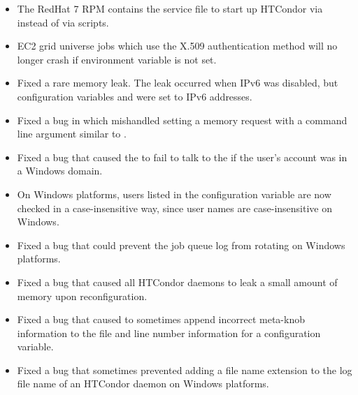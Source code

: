 \begin{itemize}

\item The RedHat 7 RPM contains the service file to start up 
HTCondor via  instead of via  scripts.


\item EC2 grid universe jobs which use the X.509 authentication method will
no longer crash if environment variable  is not set.

\item Fixed a rare memory leak. 
The leak occurred when IPv6 was disabled, 
but configuration variables  
and  were set to IPv6 addresses.

\item Fixed a bug in which  mishandled setting a memory request 
with a command line argument similar to .

\item Fixed a bug that caused the  to fail to talk
to the  if the user's account was in a Windows domain.

\item On Windows platforms, users listed in the  
configuration variable are now checked in a case-insensitive way,
since user names are case-insensitive on Windows.

\item Fixed a bug that could prevent the  job queue log 
from rotating on Windows platforms.

\item Fixed a bug that caused all HTCondor daemons to leak 
a small amount of memory upon reconfiguration.

\item Fixed a bug that caused   to sometimes append incorrect meta-knob
information to the file and line number information for a configuration variable.

\item Fixed a bug that sometimes prevented adding a  file name
extension to the log file name of an HTCondor daemon on Windows platforms.


\end{itemize}
